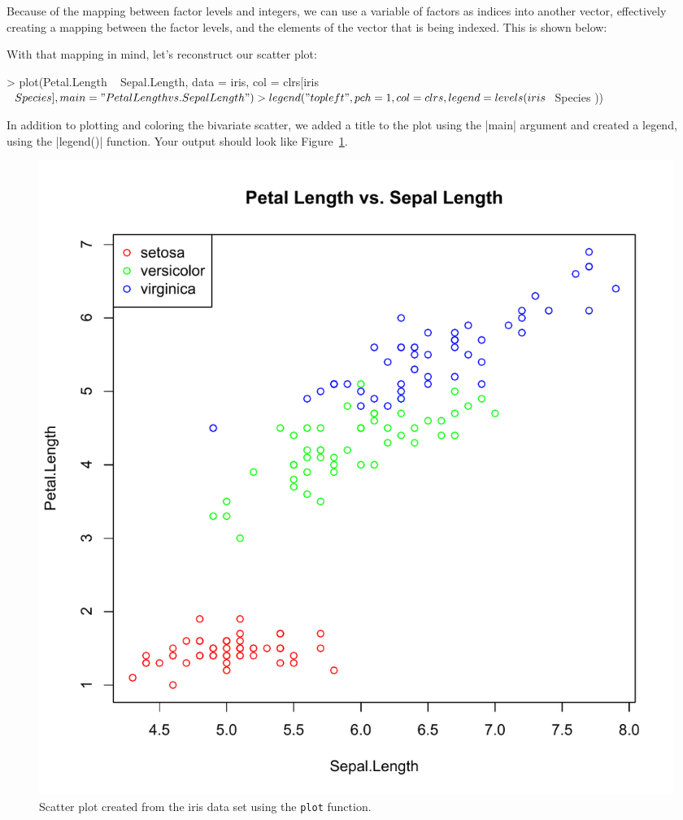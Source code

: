 Because of the mapping between factor levels and integers, we can use a variable of factors as indices into another vector, effectively creating a mapping between the factor levels, and the elements of the vector that is being indexed.  This is shown below:
%
With that mapping in mind, let's reconstruct our scatter plot:
\begin{R}
> plot(Petal.Length ~ Sepal.Length, data = iris, col = clrs[iris$Species], main="Petal Length vs. Sepal Length")
> legend( "topleft", pch = 1, col = clrs, legend = levels(iris$Species ))
\end{R}
%
In addition to plotting and coloring the bivariate scatter, we added a title to the plot using the |main| argument and created a legend, using the |legend()| function.  Your output should look like Figure~\ref{fig:irisscatter}.
%
\begin{figure}[htbp]
\centering
\includegraphics[width=0.4\columnwidth]{./figures/hands-on2/iris-scatter.pdf}
\caption{Scatter plot created from the iris data set using the \lstinline!plot! function.}
\label{fig:irisscatter}
\end{figure}


